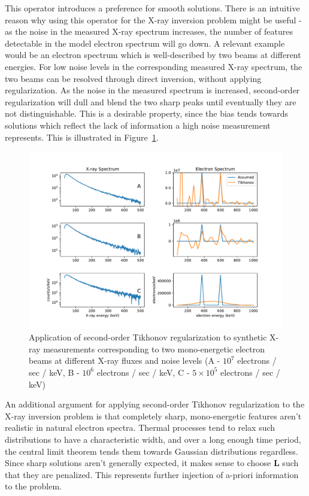 This operator introduces a preference for smooth solutions. There is an intuitive reason why using this operator for the X-ray inversion problem might be useful - as the noise in the measured X-ray spectrum increases, the number of features detectable in the model electron spectrum will go down. A relevant example would be an electron spectrum which is well-described by two beams at different energies. For low noise levels in the corresponding measured X-ray spectrum, the two beams can be resolved through direct inversion, without applying regularization. As the noise in the measured spectrum is increased, second-order regularization will dull and blend the two sharp peaks until eventually they are not distinguishable.  This is a desirable property, since the bias tends towards solutions which reflect the lack of information a high noise measurement represents. This is illustrated in Figure~\ref{two_peak_second_order_example}.

\begin{figure}[p]
    \centering
    \includegraphics[width=1.1\textwidth]{figures/chapter_4/two_peak_second_order_example/fig.pdf}
    \caption{Application of second-order Tikhonov regularization to synthetic X-ray measurements corresponding to two mono-energetic electron beams at different X-ray fluxes and noise levels (A - $10^7$ electrons / sec / keV, B - $10^6$ electrons / sec / keV, C - $5\times10^5$ electrons / sec / keV)}
    \label{two_peak_second_order_example}
\end{figure}
\newpage

An additional argument for applying second-order Tikhonov regularization to the X-ray inversion problem is that completely sharp, mono-energetic features aren't realistic in natural electron spectra. Thermal processes tend to relax such distributions to have a characteristic width, and over a long enough time period, the central limit theorem tends them towards Gaussian distributions regardless. Since sharp solutions aren't generally expected, it makes sense to choose $\mathbf{L}$ such that they are penalized. This represents further injection of a-priori information to the problem.  

